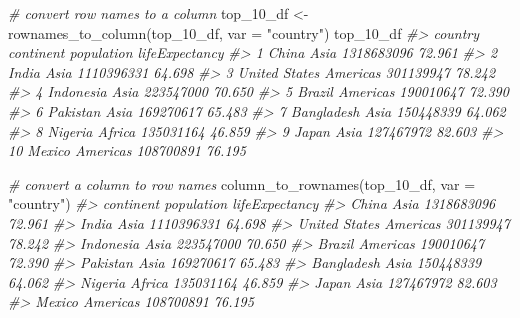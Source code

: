 \documentclass[
]{book}
\newenvironment{Shaded}{\begin{snugshade}}{\end{snugshade}}
\newcommand{\AttributeTok}[1]{\textcolor[rgb]{0.77,0.63,0.00}{#1}}
\newcommand{\CommentTok}[1]{\textcolor[rgb]{0.56,0.35,0.01}{\textit{#1}}}
\newcommand{\FunctionTok}[1]{\textcolor[rgb]{0.00,0.00,0.00}{#1}}
\newcommand{\NormalTok}[1]{#1}
\newcommand{\OtherTok}[1]{\textcolor[rgb]{0.56,0.35,0.01}{#1}}
\newcommand{\StringTok}[1]{\textcolor[rgb]{0.31,0.60,0.02}{#1}}
\begin{document}
\begin{Shaded}
\begin{Highlighting}[]
\CommentTok{\# convert row names to a column}
\NormalTok{top\_10\_df }\OtherTok{\textless{}{-}} \FunctionTok{rownames\_to\_column}\NormalTok{(top\_10\_df, }\AttributeTok{var =} \StringTok{"country"}\NormalTok{)}
\NormalTok{top\_10\_df}
\CommentTok{\#\textgreater{}          country continent population lifeExpectancy}
\CommentTok{\#\textgreater{} 1          China      Asia 1318683096         72.961}
\CommentTok{\#\textgreater{} 2          India      Asia 1110396331         64.698}
\CommentTok{\#\textgreater{} 3  United States  Americas  301139947         78.242}
\CommentTok{\#\textgreater{} 4      Indonesia      Asia  223547000         70.650}
\CommentTok{\#\textgreater{} 5         Brazil  Americas  190010647         72.390}
\CommentTok{\#\textgreater{} 6       Pakistan      Asia  169270617         65.483}
\CommentTok{\#\textgreater{} 7     Bangladesh      Asia  150448339         64.062}
\CommentTok{\#\textgreater{} 8        Nigeria    Africa  135031164         46.859}
\CommentTok{\#\textgreater{} 9          Japan      Asia  127467972         82.603}
\CommentTok{\#\textgreater{} 10        Mexico  Americas  108700891         76.195}

\CommentTok{\# convert a column to row names}
\FunctionTok{column\_to\_rownames}\NormalTok{(top\_10\_df, }\AttributeTok{var =} \StringTok{"country"}\NormalTok{)}
\CommentTok{\#\textgreater{}               continent population lifeExpectancy}
\CommentTok{\#\textgreater{} China              Asia 1318683096         72.961}
\CommentTok{\#\textgreater{} India              Asia 1110396331         64.698}
\CommentTok{\#\textgreater{} United States  Americas  301139947         78.242}
\CommentTok{\#\textgreater{} Indonesia          Asia  223547000         70.650}
\CommentTok{\#\textgreater{} Brazil         Americas  190010647         72.390}
\CommentTok{\#\textgreater{} Pakistan           Asia  169270617         65.483}
\CommentTok{\#\textgreater{} Bangladesh         Asia  150448339         64.062}
\CommentTok{\#\textgreater{} Nigeria          Africa  135031164         46.859}
\CommentTok{\#\textgreater{} Japan              Asia  127467972         82.603}
\CommentTok{\#\textgreater{} Mexico         Americas  108700891         76.195}


\end{Highlighting}
\end{Shaded}
\end{document}
